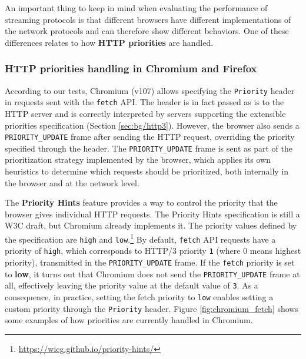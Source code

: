 An important thing to keep in mind when evaluating the performance of streaming protocols is that different browsers have different implementations of the network protocols and can therefore show different behaviors. One of these differences relates to how \textbf{HTTP priorities} are handled.

\subsubsection{HTTP priorities handling in Chromium and Firefox}
\label{sec:eval/browsers/priorities}

According to our tests, Chromium (v107) allows specifying the \texttt{Priority} header in requests sent with the \texttt{fetch} API. The header is in fact passed as is to the HTTP server and is correctly interpreted by servers supporting the extensible priorities specification (Section \ref{sec:bg/http3}). However, the browser also sends a \texttt{PRIORITY\_UPDATE} frame after sending the HTTP request, overriding the priority specified through the header. The \texttt{PRIORITY\_UPDATE} frame is sent as part of the prioritization strategy implemented by the browser, which applies its own heuristics to determine which requests should be prioritized, both internally in the browser and at the network level.

The \textbf{Priority Hints} feature provides a way to control the priority that the browser gives individual HTTP requests. The Priority Hints specification is still a W3C draft, but Chromium already implements it. The priority values defined by the specification are \texttt{high} and \texttt{low}.\footnote{\url{https://wicg.github.io/priority-hints/}} By default, \texttt{fetch} API requests have a priority of \texttt{high}, which corresponds to HTTP/3 priority \texttt{1} (where 0 means highest priority), transmitted in the \texttt{PRIORITY\_UPDATE} frame. If the \texttt{fetch} priority is set to \textbf{low}, it turns out that Chromium does not send the \texttt{PRIORITY\_UPDATE} frame at all, effectively leaving the priority value at the default value of \texttt{3}. As a consequence, in practice, setting the fetch priority to \texttt{low} enables setting a custom priority through the \texttt{Priority} header. Figure \ref{fig:chromium_fetch} shows some examples of how priorities are currently handled in Chromium.

